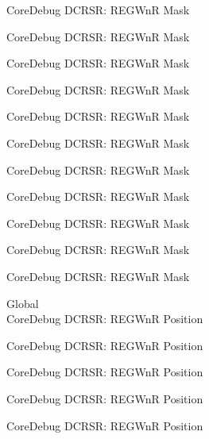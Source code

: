 \begin{DoxyRefList}
\label{deprecated__deprecated000404}%
%
Core\+Debug DCRSR\+: REGWnR Mask 

\label{deprecated__deprecated000493}%
%
Core\+Debug DCRSR\+: REGWnR Mask 

\label{deprecated__deprecated000595}%
%
Core\+Debug DCRSR\+: REGWnR Mask 

\label{deprecated__deprecated000720}%
%
Core\+Debug DCRSR\+: REGWnR Mask 

\label{deprecated__deprecated000808}%
%
Core\+Debug DCRSR\+: REGWnR Mask 

\label{deprecated__deprecated000864}%
%
Core\+Debug DCRSR\+: REGWnR Mask 

\label{deprecated__deprecated000947}%
%
Core\+Debug DCRSR\+: REGWnR Mask 

\label{deprecated__deprecated001006}%
%
Core\+Debug DCRSR\+: REGWnR Mask 

\label{deprecated__deprecated001082}%
%
Core\+Debug DCRSR\+: REGWnR Mask 

\label{deprecated__deprecated001171}%
%
Core\+Debug DCRSR\+: REGWnR Mask 

\label{deprecated__deprecated001273}%
%
Core\+Debug DCRSR\+: REGWnR Mask  
\item[Global \doxylink{group___c_m_s_i_s___core_debug_ga51e75942fc0614bc9bb2c0e96fcdda9a}{Core\+Debug\+\_\+\+DCRSR\+\_\+\+REGWn\+R\+\_\+\+Pos} ]\hfill \\
\label{deprecated__deprecated000041}%
%
Core\+Debug DCRSR\+: REGWnR Position 

\label{deprecated__deprecated000129}%
%
Core\+Debug DCRSR\+: REGWnR Position 

\label{deprecated__deprecated000185}%
%
Core\+Debug DCRSR\+: REGWnR Position 

\label{deprecated__deprecated000268}%
%
Core\+Debug DCRSR\+: REGWnR Position 

\label{deprecated__deprecated000327}%
%
Core\+Debug DCRSR\+: REGWnR Position 


\end{DoxyRefList}
